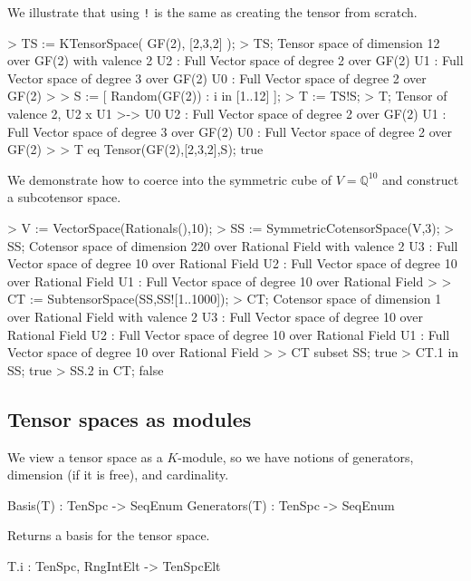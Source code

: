 \begin{example}[TenCoerce]
We illustrate that using {\tt !} is the same as creating the tensor from scratch.

\begin{code}
> TS := KTensorSpace( GF(2), [2,3,2] );
> TS;
Tensor space of dimension 12 over GF(2) with valence 2
U2 : Full Vector space of degree 2 over GF(2)
U1 : Full Vector space of degree 3 over GF(2)
U0 : Full Vector space of degree 2 over GF(2)
> 
> S := [ Random(GF(2)) : i in [1..12] ];
> T := TS!S;
> T;
Tensor of valence 2, U2 x U1 >-> U0
U2 : Full Vector space of degree 2 over GF(2)
U1 : Full Vector space of degree 3 over GF(2)
U0 : Full Vector space of degree 2 over GF(2)
> 
> T eq Tensor(GF(2),[2,3,2],S);
true
\end{code}

We demonstrate how to coerce into the symmetric cube of $V=\mathbb{Q}^{10}$ and construct a subcotensor space.

\begin{code}
> V := VectorSpace(Rationals(),10);
> SS := SymmetricCotensorSpace(V,3);
> SS;
Cotensor space of dimension 220 over Rational Field with valence 2
U3 : Full Vector space of degree 10 over Rational Field
U2 : Full Vector space of degree 10 over Rational Field
U1 : Full Vector space of degree 10 over Rational Field
> 
> CT := SubtensorSpace(SS,SS![1..1000]);
> CT;
Cotensor space of dimension 1 over Rational Field with valence 2
U3 : Full Vector space of degree 10 over Rational Field
U2 : Full Vector space of degree 10 over Rational Field
U1 : Full Vector space of degree 10 over Rational Field
> 
> CT subset SS;
true
> CT.1 in SS;
true
> SS.2 in CT;
false
\end{code}
\end{example}

\subsection{Tensor spaces as modules}

We view a tensor space as a $K$-module, so we have notions of generators, 
dimension (if it is free), and cardinality.

\begin{intrinsics}
Basis(T) : TenSpc -> SeqEnum
Generators(T) : TenSpc -> SeqEnum
\end{intrinsics}

Returns a basis for the tensor space. 

\begin{intrinsics}
T.i : TenSpc, RngIntElt -> TenSpcElt
\end{intrinsics}


